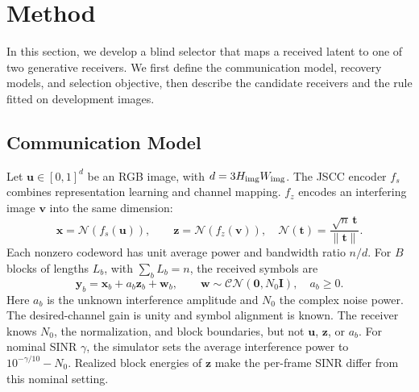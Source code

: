 \documentclass[conference]{IEEEtran}
\newcommand{\norm}[1]{\lVert#1\rVert}
\begin{document}
\section{Method}
\label{sec:method}
In this section, we develop a blind selector that maps a received latent to
one of two generative receivers. We first define the communication model,
recovery models, and selection objective, then describe the candidate
receivers and the rule fitted on development images.

\subsection{Communication Model}
Let $\bm u\in[0,1]^d$ be an RGB image, with $d=3H_{\rm img}W_{\rm img}$.
The JSCC encoder $f_s$ combines representation learning and channel mapping.
$f_z$ encodes an interfering image $\bm v$ into the same dimension:
\begin{equation}
 \bm x=\mathcal N(f_s(\bm u)),\qquad
 \bm z=\mathcal N(f_z(\bm v)),\quad
 \mathcal N(\bm t)=\frac{\sqrt n\,\bm t}{\norm{\bm t}}.
 \label{eq:encode}
\end{equation}
Each nonzero codeword has unit average power and bandwidth ratio $n/d$. For $B$
blocks of lengths $L_b$, with $\sum_bL_b=n$, the received symbols are
\begin{equation}
 \bm y_b=\bm x_b+a_b\bm z_b+\bm w_b,\qquad
 \bm w\sim\mathcal{CN}(\bm0,N_0\bm I),\quad a_b\ge0 .
 \label{eq:channel}
\end{equation}
Here $a_b$ is the unknown interference amplitude and $N_0$ the complex noise
power. The desired-channel gain is unity and symbol alignment is known.
The receiver knows $N_0$, the normalization, and block
boundaries, but not $\bm u$, $\bm z$, or $a_b$. For nominal SINR $\gamma$, the
simulator sets the average interference power to $10^{-\gamma/10}-N_0$.
Realized block energies of $\bm z$ make the per-frame SINR differ from this
nominal setting.
\end{document}
